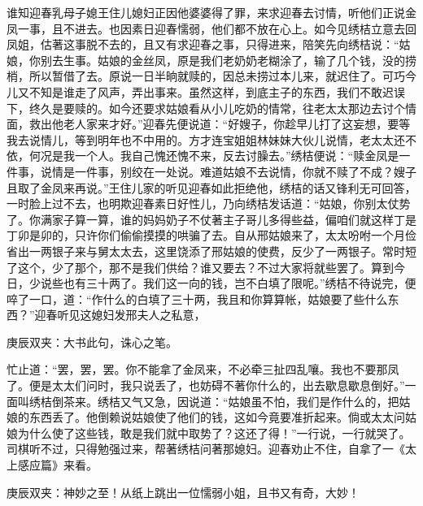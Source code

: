 \begin{parag}
    谁知迎春乳母子媳王住儿媳妇正因他婆婆得了罪，来求迎春去讨情，听他们正说金凤一事，且不进去。也因素日迎春懦弱，他们都不放在心上。如今见绣桔立意去回凤姐，估著这事脱不去的，且又有求迎春之事，只得进来，陪笑先向绣桔说：“姑娘，你别去生事。姑娘的金丝凤，原是我们老奶奶老糊涂了，输了几个钱，没的捞梢，所以暂借了去。原说一日半晌就赎的，因总未捞过本儿来，就迟住了。可巧今儿又不知是谁走了风声，弄出事来。虽然这样，到底主子的东西，我们不敢迟误下，终久是要赎的。如今还要求姑娘看从小儿吃奶的情常，往老太太那边去讨个情面，救出他老人家来才好。”迎春先便说道：“好嫂子，你趁早儿打了这妄想，要等我去说情儿，等到明年也不中用的。方才连宝姐姐林妹妹大伙儿说情，老太太还不依，何况是我一个人。我自己愧还愧不来，反去讨臊去。”绣桔便说：“赎金凤是一件事，说情是一件事，别绞在一处说。难道姑娘不去说情，你就不赎了不成？嫂子且取了金凤来再说。”王住儿家的听见迎春如此拒绝他，绣桔的话又锋利无可回答，一时脸上过不去，也明欺迎春素日好性儿，乃向绣桔发话道：“姑娘，你别太仗势了。你满家子算一算，谁的妈妈奶子不仗著主子哥儿多得些益，偏咱们就这样丁是丁卯是卯的，只许你们偷偷摸摸的哄骗了去。自从邢姑娘来了，太太吩咐一个月俭省出一两银子来与舅太太去，这里饶添了邢姑娘的使费，反少了一两银子。常时短了这个，少了那个，那不是我们供给？谁又要去？不过大家将就些罢了。算到今日，少说些也有三十两了。我们这一向的钱，岂不白填了限呢。”绣桔不待说完，便啐了一口，道：“作什么的白填了三十两，我且和你算算帐，姑娘要了些什么东西？”迎春听见这媳妇发邢夫人之私意，\begin{note}庚辰双夹：大书此句，诛心之笔。\end{note}忙止道：“罢，罢，罢。你不能拿了金凤来，不必牵三扯四乱嚷。我也不要那凤了。便是太太们问时，我只说丢了，也妨碍不著你什么的，出去歇息歇息倒好。”一面叫绣桔倒茶来。绣桔又气又急，因说道：“姑娘虽不怕，我们是作什么的，把姑娘的东西丢了。他倒赖说姑娘使了他们的钱，这如今竟要准折起来。倘或太太问姑娘为什么使了这些钱，敢是我们就中取势了？这还了得！”一行说，一行就哭了。司棋听不过，只得勉强过来，帮著绣桔问著那媳妇。迎春劝止不住，自拿了一《太上感应篇》来看。\begin{note}庚辰双夹：神妙之至！从纸上跳出一位懦弱小姐，且书又有奇，大妙！\end{note}
\end{parag}


